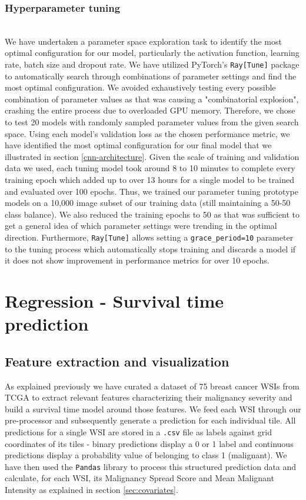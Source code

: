 \documentclass{l4proj}
\begin{document}
\subsubsection{Hyperparameter tuning}\hfill\\ \label{impl-hyperparam}
We have undertaken a parameter space exploration task to identify the most optimal configuration for our model, particularly the activation function, learning rate, batch size and dropout rate. We have utilized PyTorch's \texttt{Ray[Tune]} package to automatically search through combinations of parameter settings and find the most optimal configuration. We avoided exhaustively testing every possible combination of parameter values as that was causing a "combinatorial explosion", crashing the entire process due to overloaded GPU memory. Therefore, we chose to test 20 models with randomly sampled parameter values from the given search space. Using each model's validation loss as the chosen performance metric, we have identified the most optimal configuration  for our final model that we illustrated in section \ref{cnn-architecture}. Given the scale of training and validation data we used, each tuning model took around 8 to 10 minutes to complete every training epoch which added up to over 13 hours for a single model to be trained and evaluated over 100 epochs. Thus, we trained our parameter tuning prototype models on a 10,000 image subset of our training data (still maintaining a 50-50 class balance). We also reduced the training epochs to 50 as that was sufficient to get a general idea of which parameter settings were trending in the optimal direction. Furthermore, \texttt{Ray[Tune]} allows setting a \texttt{grace\_period=10} parameter to the tuning process which automatically stops training and discards a model if it does not show improvement in performance metrics for over 10 epochs.
 

\section{Regression - Survival time prediction}
\subsection{Feature extraction and visualization}
As explained previously we have curated a dataset of 75 breast cancer WSIs from TCGA to extract relevant features characterizing their malignancy severity and build a survival time model around those features. We feed each WSI through our pre-processor and subsequently generate a prediction for each individual tile. All predictions for a single WSI are stored in a \texttt{.csv} file as labels against  grid coordinates of its tiles - binary predictions display a 0 or 1 label and continuous predictions display a probability value of belonging to class 1 (malignant). We have then used the \texttt{Pandas} library to process this structured prediction data and calculate, for each WSI, its Malignancy Spread Score and Mean Malignant Intensity as explained in section \ref{sec:covariates}. 
\end{document}
